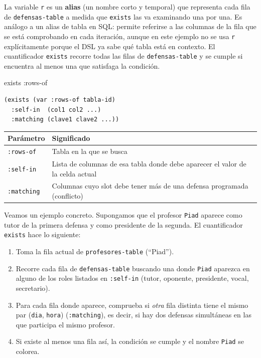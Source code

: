 \documentclass[12pt,a4paper]{report}
\begin{document}
La variable \texttt{r} es un \textbf{alias} (un nombre corto y temporal)
que representa cada fila de \texttt{defensas-table} a medida que
\texttt{exists} las va examinando una por una.  Es análogo a un alias de
tabla en SQL: permite referirse a las columnas de la fila que se está
comprobando en cada iteración, aunque en este ejemplo no se usa
\texttt{r} explícitamente porque el DSL ya sabe qué tabla está en
contexto.  El cuantificador \texttt{exists} recorre todas las filas de
\texttt{defensas-table} y se cumple si encuentra al menos una que
satisfaga la condición.

\begin{sintaxisbox}{exists :rows-of}
\begin{lstlisting}
(exists (var :rows-of tabla-id)
  :self-in  (col1 col2 ...)
  :matching (clave1 clave2 ...))
\end{lstlisting}
\end{sintaxisbox}

\begin{center}
\renewcommand{\arraystretch}{1.3}
\begin{tabular}{>{\ttfamily}p{3.5cm}p{8.5cm}}
\toprule
\textbf{Parámetro} & \textbf{Significado} \\
\midrule
\texttt{:rows-of} & Tabla en la que se busca \\
\texttt{:self-in} & Lista de columnas de esa tabla donde debe aparecer
                    el valor de la celda actual \\
\texttt{:matching} & Columnas cuyo slot debe tener más de una defensa
                     programada (conflicto) \\
\bottomrule
\end{tabular}
\end{center}

Veamos un ejemplo concreto.  Supongamos que el profesor \texttt{Piad}
aparece como tutor de la primera defensa y como presidente de la segunda.
El cuantificador \texttt{exists} hace lo siguiente:

\begin{enumerate}
  \item Toma la fila actual de \texttt{profesores-table} (``Piad'').
  \item Recorre cada fila de \texttt{defensas-table} buscando una donde
        \texttt{Piad} aparezca en alguno de los roles listados en
        \texttt{:self-in} (tutor, oponente, presidente, vocal, secretario).
  \item Para cada fila donde aparece, comprueba si \emph{otra} fila
        distinta tiene el mismo par (\texttt{dia}, \texttt{hora})
        (\texttt{:matching}), es decir, si hay dos defensas simultáneas
        en las que participa el mismo profesor.
  \item Si existe al menos una fila así, la condición se cumple y el
        nombre \texttt{Piad} se colorea.
\end{enumerate}
\end{document}
